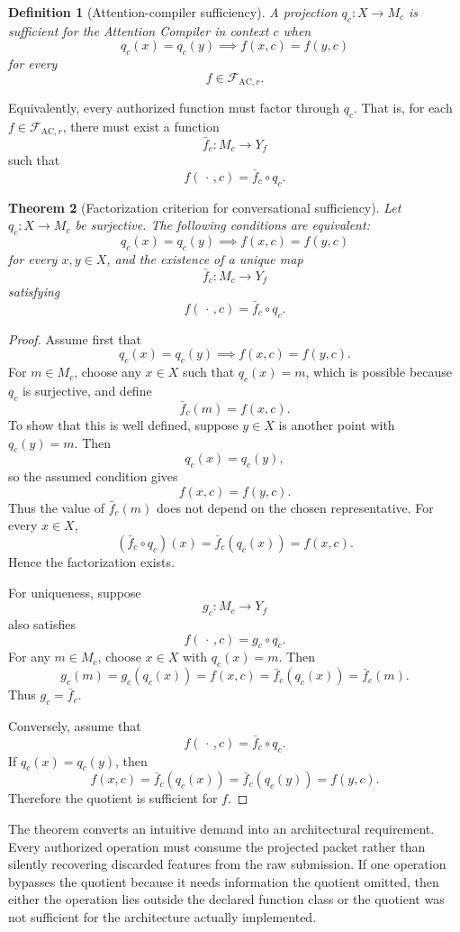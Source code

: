 \documentclass[11pt]{article}
\newtheorem{definition}{Definition}[section]
\newtheorem{theorem}[definition]{Theorem}
\theoremstyle{definition}
\newcommand{\F}{\mathcal{F}}
\begin{document}
\begin{definition}[Attention-compiler sufficiency]
A projection \(q_c:X\to M_c\) is sufficient for the Attention Compiler in context \(c\) when
\[
q_c(x)=q_c(y)
\implies
f(x,c)=f(y,c)
\]
for every
\[
f\in\F_{\mathrm{AC},r}.
\]
\end{definition}

Equivalently, every authorized function must factor through \(q_c\). That is, for each \(f\in\F_{\mathrm{AC},r}\), there must exist a function
\[
\bar f_c:M_c\longrightarrow Y_f
\]
such that
\[
f(\,\cdot\,,c)
=
\bar f_c\circ q_c.
\]

\begin{theorem}[Factorization criterion for conversational sufficiency]
Let \(q_c:X\to M_c\) be surjective. The following conditions are equivalent:
\[
q_c(x)=q_c(y)
\implies
f(x,c)=f(y,c)
\]
for every \(x,y\in X\), and the existence of a unique map
\[
\bar f_c:M_c\to Y_f
\]
satisfying
\[
f(\,\cdot\,,c)=\bar f_c\circ q_c.
\]
\end{theorem}

\begin{proof}
Assume first that
\[
q_c(x)=q_c(y)
\implies
f(x,c)=f(y,c).
\]
For \(m\in M_c\), choose any \(x\in X\) such that \(q_c(x)=m\), which is possible because \(q_c\) is surjective, and define
\[
\bar f_c(m)=f(x,c).
\]
To show that this is well defined, suppose \(y\in X\) is another point with \(q_c(y)=m\). Then
\[
q_c(x)=q_c(y),
\]
so the assumed condition gives
\[
f(x,c)=f(y,c).
\]
Thus the value of \(\bar f_c(m)\) does not depend on the chosen representative. For every \(x\in X\),
\[
(\bar f_c\circ q_c)(x)
=
\bar f_c(q_c(x))
=
f(x,c).
\]
Hence the factorization exists.

For uniqueness, suppose
\[
g_c:M_c\to Y_f
\]
also satisfies
\[
f(\,\cdot\,,c)=g_c\circ q_c.
\]
For any \(m\in M_c\), choose \(x\in X\) with \(q_c(x)=m\). Then
\[
g_c(m)
=
g_c(q_c(x))
=
f(x,c)
=
\bar f_c(q_c(x))
=
\bar f_c(m).
\]
Thus \(g_c=\bar f_c\).

Conversely, assume that
\[
f(\,\cdot\,,c)=\bar f_c\circ q_c.
\]
If \(q_c(x)=q_c(y)\), then
\[
f(x,c)
=
\bar f_c(q_c(x))
=
\bar f_c(q_c(y))
=
f(y,c).
\]
Therefore the quotient is sufficient for \(f\).
\end{proof}

The theorem converts an intuitive demand into an architectural requirement. Every authorized operation must consume the projected packet rather than silently recovering discarded features from the raw submission. If one operation bypasses the quotient because it needs information the quotient omitted, then either the operation lies outside the declared function class or the quotient was not sufficient for the architecture actually implemented.
\end{document}
